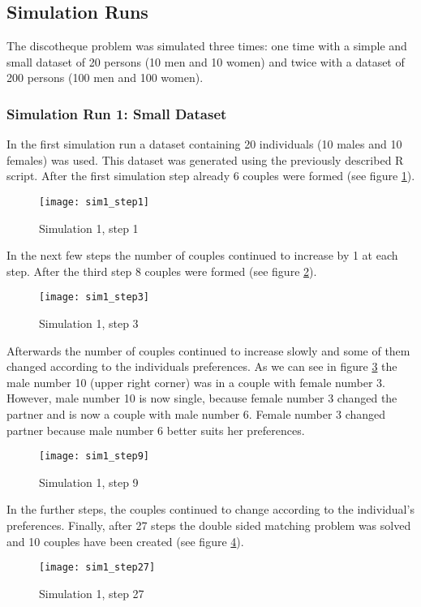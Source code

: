 \clearpage
\subsection{Simulation Runs}
The discotheque problem was simulated three times: one time with a simple and small dataset of 20 persons (10 men and 10 women) and twice with a dataset of 200 persons (100 men and 100 women).

\subsubsection{Simulation Run 1: Small Dataset}
In the first simulation run a dataset containing 20 individuals (10 males and 10 females) was used. 
This dataset was generated using the previously described R script.
After the first simulation step already 6 couples were formed (see figure \ref{fig:sim1_step1}).
\begin{figure}[H]
  \centering
  \texttt{[image: sim1\_step1]}
	\caption{Simulation 1, step 1}
	\label{fig:sim1_step1}
\end{figure}

In the next few steps the number of couples continued to increase by 1 at each step. 
After the third step 8 couples were formed (see figure \ref{fig:sim1_step3}).
\begin{figure}[H]
  \centering
  \texttt{[image: sim1\_step3]}
	\caption{Simulation 1, step 3}
	\label{fig:sim1_step3}
\end{figure}

Afterwards the number of couples continued to increase slowly and some of them changed according to the individuals preferences. 
As we can see in figure \ref{fig:sim1_step9} the male number 10 (upper right corner) was in a couple with female number 3. 
However, male number 10 is now single, because female number 3 changed the partner and is now a couple with male number 6. 
Female number 3 changed partner because male number 6 better suits her preferences.
\begin{figure}[H]
  \centering
  \texttt{[image: sim1\_step9]}
	\caption{Simulation 1, step 9}
	\label{fig:sim1_step9}
\end{figure}

In the further steps, the couples continued to change according to the individual's preferences. 
Finally, after 27 steps the double sided matching problem was solved and 10 couples have been created (see figure \ref{fig:sim1_step27}).
\begin{figure}[H]
  \centering
  \texttt{[image: sim1\_step27]}
	\caption{Simulation 1, step 27}
	\label{fig:sim1_step27}
\end{figure}


